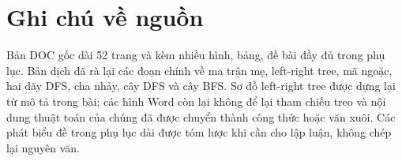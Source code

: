 \documentclass[11pt]{article}
\begin{document}
\section*{Ghi chú về nguồn}

Bản DOC gốc dài 52 trang và kèm nhiều hình, bảng, đề bài đầy đủ trong phụ lục.
Bản dịch đã rà lại các đoạn chính về ma trận mẹ, left-right tree, mã ngoặc,
hai dãy DFS, cha nhảy, cây DFS và cây BFS. Sơ đồ left-right tree được dựng lại
từ mô tả trong bài; các hình Word còn lại không để lại tham chiếu treo và nội
dung thuật toán của chúng đã được chuyển thành công thức hoặc văn xuôi. Các phát
biểu đề trong phụ lục dài được tóm lược khi cần cho lập luận, không chép lại
nguyên văn.
\end{document}
